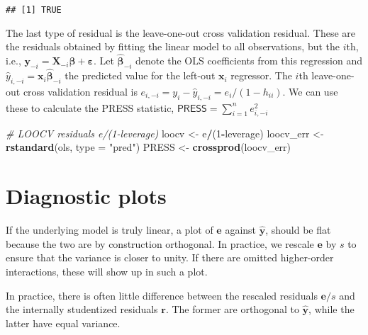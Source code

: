 \documentclass[]{book}
\newenvironment{Shaded}{\begin{snugshade}}{\end{snugshade}}
\newcommand{\CommentTok}[1]{\textcolor[rgb]{0.56,0.35,0.01}{\textit{#1}}}
\newcommand{\DataTypeTok}[1]{\textcolor[rgb]{0.13,0.29,0.53}{#1}}
\newcommand{\DecValTok}[1]{\textcolor[rgb]{0.00,0.00,0.81}{#1}}
\newcommand{\KeywordTok}[1]{\textcolor[rgb]{0.13,0.29,0.53}{\textbf{#1}}}
\newcommand{\NormalTok}[1]{#1}
\newcommand{\OperatorTok}[1]{\textcolor[rgb]{0.81,0.36,0.00}{\textbf{#1}}}
\newcommand{\StringTok}[1]{\textcolor[rgb]{0.31,0.60,0.02}{#1}}
\theoremstyle{definition}
\theoremstyle{definition}
\theoremstyle{definition}
\theoremstyle{remark}
\begin{document}
\begin{verbatim}
## [1] TRUE
\end{verbatim}

The last type of residual is the leave-one-out cross validation residual. These are the residuals obtained by fitting the linear model to all observations, but the \(i\)th, i.e.,
\(\boldsymbol{y}_{-i}= \mathbf{X}_{-i}\boldsymbol{\beta}+ \boldsymbol{\varepsilon}\). Let \(\hat{\boldsymbol{\beta}}_{-i}\) denote the OLS coefficients from this regression and \(\hat{y}_{i,-i}=\mathbf{x}_i\hat{\boldsymbol{\beta}}_{-i}\) the predicted value for the left-out \(\mathbf{x}_i\) regressor. The \(i\)th leave-one-out cross validation residual is \(e_{i,-i}=y_i - \hat{y}_{i,-i}=e_i/(1-h_{ii})\). We can use these to calculate the PRESS statistic, \(\mathsf{PRESS}=\sum_{i=1}^n e_{i, -i}^2\)

\begin{Shaded}
\begin{Highlighting}[]
\CommentTok{# LOOCV residuals e/(1-leverage)}
\NormalTok{loocv <-}\StringTok{ }\NormalTok{e}\OperatorTok{/}\NormalTok{(}\DecValTok{1}\OperatorTok{-}\NormalTok{leverage)}
\NormalTok{loocv_err <-}\StringTok{ }\KeywordTok{rstandard}\NormalTok{(ols, }\DataTypeTok{type =} \StringTok{"pred"}\NormalTok{)}
\NormalTok{PRESS <-}\StringTok{ }\KeywordTok{crossprod}\NormalTok{(loocv_err)}
\end{Highlighting}
\end{Shaded}

\hypertarget{diagnostic-plots}{%
\section{Diagnostic plots}\label{diagnostic-plots}}

If the underlying model is truly linear, a plot of \(\boldsymbol{e}\) against \(\hat{\boldsymbol{y}}\), should be flat because the two are by construction orthogonal. In practice, we rescale \(\boldsymbol{e}\) by \(s\) to ensure that the variance is closer to unity. If there are omitted higher-order interactions, these will show up in such a plot.

In practice, there is often little difference between the rescaled residuals \(\boldsymbol{e}/s\) and the internally studentized residuals \(\boldsymbol{r}\). The former are orthogonal to \(\hat{\boldsymbol{y}}\), while the latter have equal variance.
\end{document}
